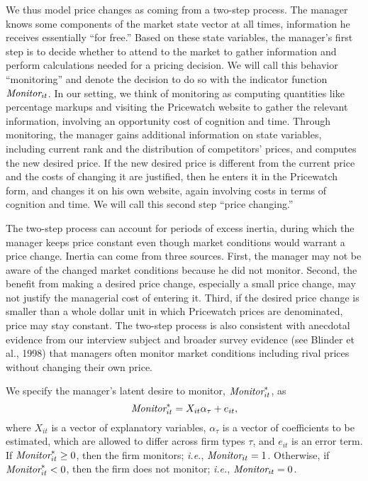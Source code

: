 \documentclass[11pt]{article}
\newcommand{\Monitor}{\mbox{\it Monitor}}
\begin{document}
\begin{spacing}{1.3}
We thus model price changes as coming from a two-step process. The
manager knows some components of the market state vector at all times,
information he receives essentially ``for free.''  Based on these
state variables, the manager's first step is to decide whether to
attend to the market to gather information and perform calculations
needed for a pricing decision. We will call this behavior
``monitoring'' and denote the decision to do so with the indicator
function $\Monitor_{it}$.  In our setting, we think of monitoring as
computing quantities like percentage markups and visiting the
Pricewatch website to gather the relevant information, involving an
opportunity cost of cognition and time. Through monitoring, the
manager gains additional information on state variables, including
current rank and the distribution of competitors' prices, and computes
the new desired price. If the new desired price is different from the
current price and the costs of changing it are justified, then he
enters it in the Pricewatch form, and changes it on his own website,
again involving costs in terms of cognition and time. We will call
this second step ``price changing.''

The two-step process can account for periods of excess inertia, during
which the manager keeps price constant even though market conditions
would warrant a price change. Inertia can come from three
sources. First, the manager may not be aware of the changed market
conditions because he did not monitor. Second, the benefit from making
a desired price change, especially a small price change, may not
justify the managerial cost of entering it. Third, if the desired
price change is smaller than a whole dollar unit in which Pricewatch
prices are denominated, price may stay constant. The two-step process
is also consistent with anecdotal evidence from our interview subject
and broader survey evidence (see Blinder et al., 1998) that managers
often monitor market conditions including rival prices without
changing their own price.

We specify the manager's latent desire to monitor, $\Monitor^*_{it}$,
as
\begin{equation}
\label{monitoring}
\Monitor_{it}^* = X_{it} \alpha_{\tau} + e_{it},
\end{equation}
where $X_{it}$ is a vector of explanatory variables, $\alpha_{\tau}$
is a vector of coefficients to be estimated, which are allowed to
differ across firm types $\tau$, and $e_{it}$ is an error term. If
$\Monitor^*_{it} \geq 0$, then the firm monitors; {\it i.e.},
$\Monitor_{it} = 1$. Otherwise, if $\Monitor^*_{it} < 0$, then the
firm does not monitor; {\it i.e.}, $\Monitor_{it} = 0$.


\end{spacing}
\end{document}
